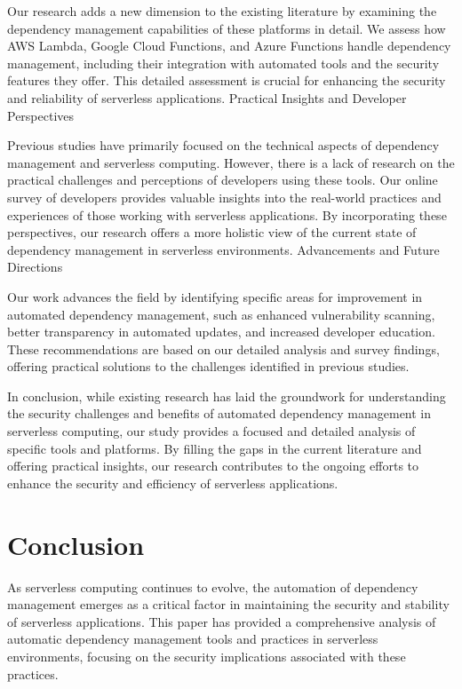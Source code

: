 \documentclass[sigconf]{acmart}
\begin{document}
Our research adds a new dimension to the existing literature by examining the dependency management capabilities of these platforms in detail. We assess how AWS Lambda, Google Cloud Functions, and Azure Functions handle dependency management, including their integration with automated tools and the security features they offer. This detailed assessment is crucial for enhancing the security and reliability of serverless applications.
Practical Insights and Developer Perspectives

Previous studies have primarily focused on the technical aspects of dependency management and serverless computing. However, there is a lack of research on the practical challenges and perceptions of developers using these tools. Our online survey of developers provides valuable insights into the real-world practices and experiences of those working with serverless applications. By incorporating these perspectives, our research offers a more holistic view of the current state of dependency management in serverless environments.
Advancements and Future Directions

Our work advances the field by identifying specific areas for improvement in automated dependency management, such as enhanced vulnerability scanning, better transparency in automated updates, and increased developer education. These recommendations are based on our detailed analysis and survey findings, offering practical solutions to the challenges identified in previous studies.

In conclusion, while existing research has laid the groundwork for understanding the security challenges and benefits of automated dependency management in serverless computing, our study provides a focused and detailed analysis of specific tools and platforms. By filling the gaps in the current literature and offering practical insights, our research contributes to the ongoing efforts to enhance the security and efficiency of serverless applications.


\section{Conclusion}

As serverless computing continues to evolve, the automation of dependency management emerges as a critical factor in maintaining the security and stability of serverless applications. This paper has provided a comprehensive analysis of automatic dependency management tools and practices in serverless environments, focusing on the security implications associated with these practices.
\end{document}
